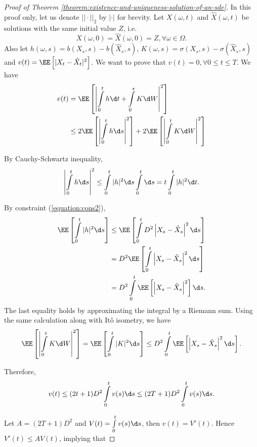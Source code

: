 \begin{proof}[Proof of Theorem \ref{theorem:existence-and-uniqueness-solution-of-an-sde}]
    In this proof only, let us denote $||\cdot||_2$ by $|\cdot|$ for brevity. Let $X(\omega,t)$ and $\hat{X}(\omega,t)$ be solutions with the same initial value $Z$, i.e.
    $$X(\omega, 0)=\hat{X}(\omega,0)=Z,\forall\omega\in\Omega.$$
    Also let $h(\omega,s)=b(X_s,s)-b(\hat{X}_s,s)$, $K(\omega,s)=\sigma(X_s,s)-\sigma(\hat{X}_s,s)$ and $v(t)=\EE\left[|X_t-\hat{X}_t|^2\right]$. We want to prove that $v(t)=0,\forall 0\le t\le T$. We have
    \begin{align*}
        v(t) & = \EE\left[\left|\int\limits_{0}^th\d t+\int\limits_{0}^s K\d W\right|^2\right]                                    \\
             & \le 2\EE\left[\left|\int\limits_{0}^th\d s\right|^2\right]+2\EE\left[\left|\int\limits_{0}^t K\d W\right|^2\right]
    \end{align*}

    By Cauchy-Schwartz inequality,
    \begin{equation}
        \label{equation:afterCauchy}
        \left|\int\limits_{0}^th\d s\right|^2\le \int\limits_{0}^t|h|^2\d s\int\limits_{0}^t\d s=t\int\limits_{0}^t|h|^2\d t.
    \end{equation}

    By constraint (\ref{equation:cons2}),
    \begin{align*}
        \EE\left[\int\limits_{0}^t|h|^2\d s\right]
         & \le\EE\left[\int\limits_{0}^tD^2\left|X_s-\hat{X}_s\right|^2\d s\right] \\
         & =D^2\EE\left[\int\limits_{0}^t\left|X_s-\hat{X}_s\right|^2\d s\right]   \\
         & =D^2\int\limits_{0}^t\EE\left[\left|X_s-\hat{X}_s\right|^2\right]\d s.
    \end{align*}
    The last equality holds by approximating the integral by a Riemann sum. Using the same calculation along with Itô isometry, we have
    $$\EE\left[\left|\int\limits_{0}^t K\d W\right|^2\right]=\EE\left[\int\limits_{0}^t |K|^2\d s\right]\le D^2\int\limits_{0}^t\EE\left[\left|X_s-\hat{X}_s\right|^2\d s\right].$$

    Therefore,
    \begin{align*}
        v(t)\le  (2t+1)D^2\int\limits_0^t v(s)\d s\le(2T+1)D^2\int\limits_0^t v(s)\d s.
    \end{align*}

    Let $A=(2T+1)D^2$ and $V(t)=\int\limits_0^t v(s)\d s$, then $v(t)=V'(t)$. Hence $V'(t)\le AV(t)$, implying that


\end{proof}
